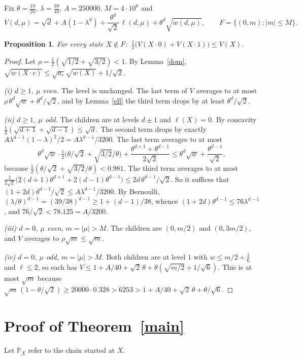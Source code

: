 \documentclass[11pt]{article}
\newtheorem{proposition}[theorem]{Proposition}
\theoremstyle{remark}
\newcommand{\PP}{\mathbb{P}}
\begin{document}
Fix $\theta=\tfrac{19}{20}$, $\lambda=\tfrac{39}{40}$, $A=250000$, $M=4\cdot10^8$ and
\[
V(d,\mu)=\sqrt d+A(1-\lambda^d)+\frac{\theta^d}{\sqrt2}\,\ell(d,\mu)+\theta^d\sqrt{w(d,\mu)},\qquad
F=\{(0,m):|m|\le M\}.
\]
\begin{proposition}\label{super}
For every state $X\notin F$: $\ \tfrac12\bigl(V(X\cdot0)+V(X\cdot1)\bigr)\le V(X)$.
\end{proposition}
\begin{proof}
Let $\rho=\tfrac12(\sqrt{1/2}+\sqrt{3/2})<1$. By Lemma~\ref{dom},
$\sqrt{w(X\cdot c)}\le\sqrt{a_c}\sqrt{w(X)}+1/\sqrt2$.

\emph{(i) $d\ge1$, $\mu$ even.} The level is unchanged. The last term of $V$ averages to at most
$\rho\,\theta^d\sqrt w+\theta^d/\sqrt2$, and by Lemma~\ref{ell} the third term drops by at least
$\theta^d/\sqrt2$.

\emph{(ii) $d\ge1$, $\mu$ odd.} The children are at levels $d\pm1$ and $\ell(X)=0$. By concavity
$\tfrac12(\sqrt{d+1}+\sqrt{d-1})\le\sqrt d$. The second term drops by exactly
$A\lambda^{d-1}(1-\lambda)^2/2=A\lambda^{d-1}/3200$. The last term averages to at most
\[
\theta^d\sqrt w\cdot\tfrac12\bigl(\theta/\sqrt2+\sqrt{3/2}/\theta\bigr)+\frac{\theta^{d+1}+\theta^{d-1}}{2\sqrt2}
\le\theta^d\sqrt w+\frac{\theta^{d-1}}{\sqrt2},
\]
because $\tfrac12(\theta/\sqrt2+\sqrt{3/2}/\theta)<0.981$. The third term averages to at most
$\frac{1}{2\sqrt2}\bigl(2(d+1)\theta^{d+1}+2(d-1)\theta^{d-1}\bigr)\le 2d\,\theta^{d-1}/\sqrt2$.
So it suffices that $(1+2d)\theta^{d-1}/\sqrt2\le A\lambda^{d-1}/3200$. By Bernoulli,
$(\lambda/\theta)^{d-1}=(39/38)^{d-1}\ge1+(d-1)/38$, whence $(1+2d)\theta^{d-1}\le76\lambda^{d-1}$,
and $76/\sqrt2<78.125=A/3200$.

\emph{(iii) $d=0$, $\mu$ even, $m=|\mu|>M$.} The children are $(0,m/2)$ and $(0,3m/2)$, and
$V$ averages to $\rho\sqrt m\le\sqrt m$.

\emph{(iv) $d=0$, $\mu$ odd, $m=|\mu|>M$.} Both children are at level $1$ with $w\le m/2+\tfrac16$ and
$\ell\le2$, so each has
$V\le1+A/40+\sqrt2\,\theta+\theta(\sqrt{m/2}+1/\sqrt6)$. This is at most $\sqrt m$ because
$\sqrt m\,(1-\theta/\sqrt2)\ge20000\cdot0.328>6253>1+A/40+\sqrt2\,\theta+\theta/\sqrt6$.
\end{proof}

\section{Proof of Theorem~\ref{main}}
Let $\PP_X$ refer to the chain started at $X$.
\end{document}
